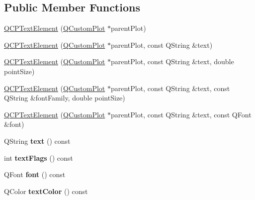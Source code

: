 \subsection*{Public Member Functions}
\begin{DoxyCompactItemize}
\item 
\hyperlink{class_q_c_p_text_element_ae1de18bdb1e7ba959f132018dd9a0258}{Q\+C\+P\+Text\+Element} (\hyperlink{class_q_custom_plot}{Q\+Custom\+Plot} $\ast$parent\+Plot)
\item 
\hyperlink{class_q_c_p_text_element_a00f08a8a3363ad8d7d12ca0db4922b6b}{Q\+C\+P\+Text\+Element} (\hyperlink{class_q_custom_plot}{Q\+Custom\+Plot} $\ast$parent\+Plot, const Q\+String \&text)
\item 
\hyperlink{class_q_c_p_text_element_a2684e65def4a5daf80be9f5f149ca9b2}{Q\+C\+P\+Text\+Element} (\hyperlink{class_q_custom_plot}{Q\+Custom\+Plot} $\ast$parent\+Plot, const Q\+String \&text, double point\+Size)
\item 
\hyperlink{class_q_c_p_text_element_adb4bcd3743dbfabfedee4fe9c2ee93da}{Q\+C\+P\+Text\+Element} (\hyperlink{class_q_custom_plot}{Q\+Custom\+Plot} $\ast$parent\+Plot, const Q\+String \&text, const Q\+String \&font\+Family, double point\+Size)
\item 
\hyperlink{class_q_c_p_text_element_a00b75787b77b39bbd083813c2a7b2520}{Q\+C\+P\+Text\+Element} (\hyperlink{class_q_custom_plot}{Q\+Custom\+Plot} $\ast$parent\+Plot, const Q\+String \&text, const Q\+Font \&font)
\item 
\mbox{\label{class_q_c_p_text_element_a453c24723b76fdcae405a8a7b0d02614}} 
Q\+String {\bfseries text} () const
\item 
\mbox{\label{class_q_c_p_text_element_a1937ed3b7454d7e815f6027895a7d480}} 
int {\bfseries text\+Flags} () const
\item 
\mbox{\label{class_q_c_p_text_element_a9247189a1c2b2bf5604645a7396b2ddc}} 
Q\+Font {\bfseries font} () const
\item 
\mbox{\label{class_q_c_p_text_element_a4b906c81abb94517500dbdb2fe9c22b9}} 
Q\+Color {\bfseries text\+Color} () const
\item 
\mbox{\label{class_q_c_p_text_element_a7119d960bdf57df74f9bcc748d2a0b43}} 

\end{DoxyCompactItemize}
